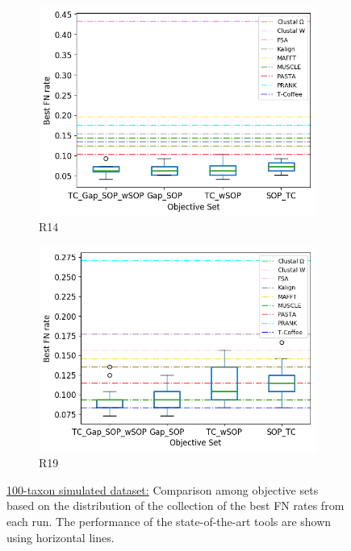 \begin{figure}[!htbp]
	\begin{subfigure}{0.32\textwidth}
		\includegraphics[width=\columnwidth]{Figure/summary/precomputedInit/R14/objset_fnrate_rank}
		\caption{R14}
	\end{subfigure}
	\begin{subfigure}{0.32\textwidth}
		\includegraphics[width=\columnwidth]{Figure/summary/precomputedInit/R19/objset_fnrate_rank}
		\caption{R19}
	\end{subfigure}
	\caption{\underline{100-taxon simulated dataset:} Comparison among objective sets based on the distribution of the collection of the best FN rates from each run. The performance of the state-of-the-art tools are shown using horizontal lines.}
	\label{fig:rank_best_fn_rate}
\end{figure}

